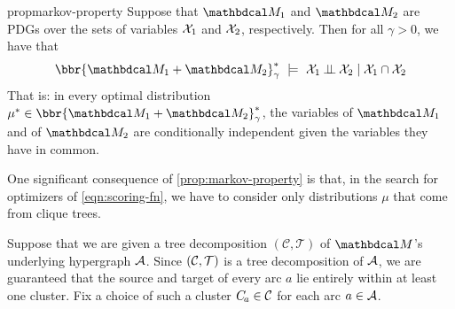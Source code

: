 \documentclass[twoside]{article}
\begin{document}
\begin{linked}{prop}{markov-property}
    Suppose that $\dg M_1$ and $\dg M_2$ are PDGs
    over the sets of variables $\mathcal X_1$ and $\mathcal X_2$, respectively.
	Then for all $\gamma > 0$, we have that
	\[
	 	\bbr{\dg M_1 \bundle \dg M_2}^*_\gamma
			~\models~
		\X_1 \mathbin{\bot\!\!\!\bot} \X_2 \mid \X_1 \cap \X_2
	\]
	That is: in every optimal distribution $\mu^* \in \bbr{\dg M_1 \bundle \dg M_2}^*_\gamma$,
    the variables of $\dg M_1$ and of $\dg M_2$ are conditionally independent given the variables they have in common.
\end{linked}

One significant consequence of \cref{prop:markov-property} is that, in the
search for optimizers of \eqref{eqn:scoring-fn}, we have to
consider only distributions $\mu$ that come from clique trees.

Suppose that we are given a tree decomposition $(\mathcal C, \mathcal T)$
of $\dg M$'s underlying hypergraph $\mathcal A$. 
Since $(\cal C, T)$ is a tree decomposition of $\mathcal A$, we are guaranteed
that the source and target of every arc $a$ lie entirely within at least one cluster.
Fix a choice of such a cluster $C\!_a \in \cal C$ for each arc $a \in \mathcal A$.
\end{document}
